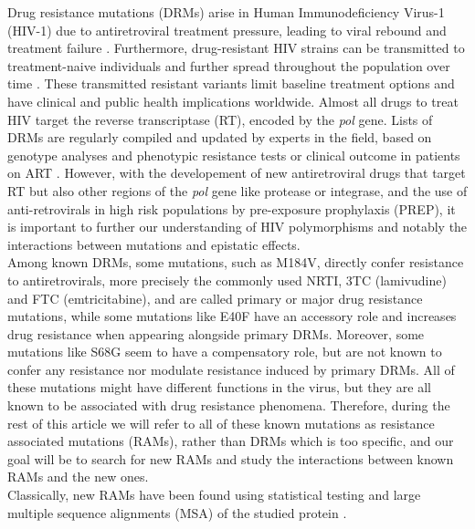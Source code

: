 \documentclass[
  11pt,
  twoside]{scrbook}
\begin{document}
Drug resistance mutations (DRMs) arise in Human Immunodeficiency Virus-1
(HIV-1) due to antiretroviral treatment pressure, leading to viral
rebound and treatment failure
\autocite{lepriResistanceProfilesPatients2000,verhofstedeDetectionDrugResistance2007}.
Furthermore, drug-resistant HIV strains can be transmitted to
treatment-naive individuals and further spread throughout the population
over time
\autocite{hueDemonstrationSustainedDrugResistant2009,mouradPhylotypebasedAnalysisHighlights2015,zhukovaRolePhylogeneticsTool2017}.
These transmitted resistant variants limit baseline treatment options
and have clinical and public health implications worldwide. Almost all
drugs to treat HIV target the reverse transcriptase (RT), encoded by the
\emph{pol} gene. Lists of DRMs are regularly compiled and updated by experts
in the field, based on genotype analyses and phenotypic resistance tests
or clinical outcome in patients on ART
\autocite{bennettDrugResistanceMutations2009,hammondMutationsRetroviralGenes1998,wensing2017UpdateDrug2016}.
However, with the developement of new antiretroviral drugs that target
RT but also other regions of the \emph{pol} gene like protease or integrase,
and the use of anti-retrovirals in high risk populations by pre-exposure
prophylaxis (PREP), it is important to further our understanding of HIV
polymorphisms and notably the interactions between mutations and
epistatic effects.\\
Among known DRMs, some mutations, such as M184V, directly confer
resistance to antiretrovirals, more precisely the commonly used NRTI,
3TC (lamivudine) and FTC (emtricitabine), and are called primary or
major drug resistance mutations, while some mutations like E40F have an
accessory role and increases drug resistance when appearing alongside
primary DRMs. Moreover, some mutations like S68G seem to have a
compensatory role, but are not known to confer any resistance nor
modulate resistance induced by primary DRMs. All of these mutations
might have different functions in the virus, but they are all known to
be associated with drug resistance phenomena. Therefore, during the rest
of this article we will refer to all of these known mutations as
resistance associated mutations (RAMs), rather than DRMs which is too
specific, and our goal will be to search for new RAMs and study the
interactions between known RAMs and the new ones.\\
Classically, new RAMs have been found using statistical testing and
large multiple sequence alignments (MSA) of the studied protein
\autocite{dudoitMultipleTestingProcedures2007,villabona-arenasIndepthAnalysisHIV12016}.
\end{document}
